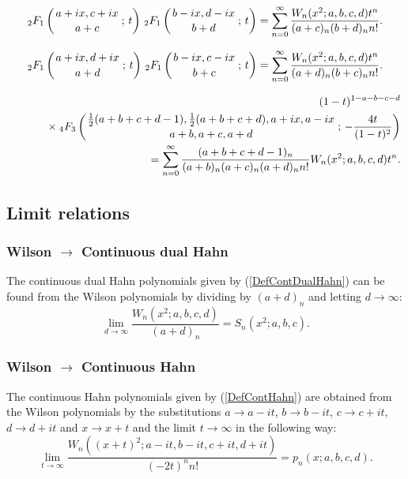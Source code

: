 \documentclass[envcountchap,graybox]{svmono}
\newcounter{rom}
\newcommand{\hyp}[5]{\mbox{}_{#1}{F}_{#2}
\left(\genfrac{}{}{0pt}{}{#3}{#4}\,;\,#5\right)}
\newcommand{\mathindent}{\hspace{7.5mm}}
\begin{document}
\begin{equation}
\label{GenWilson2}
\hyp{2}{1}{a+ix,c+ix}{a+c}{t}\,\hyp{2}{1}{b-ix,d-ix}{b+d}{t}=
\sum_{n=0}^{\infty}\frac{W_n(x^2;a,b,c,d)t^n}{(a+c)_n(b+d)_nn!}.
\end{equation}

\begin{equation}
\label{GenWilson3}
\hyp{2}{1}{a+ix,d+ix}{a+d}{t}\,\hyp{2}{1}{b-ix,c-ix}{b+c}{t}=
\sum_{n=0}^{\infty}\frac{W_n(x^2;a,b,c,d)t^n}{(a+d)_n(b+c)_nn!}.
\end{equation}

\begin{eqnarray}
\label{GenWilson4}
& &(1-t)^{1-a-b-c-d}\nonumber\\
& &{}\mathindent\times\hyp{4}{3}{\frac{1}{2}(a+b+c+d-1),\frac{1}{2}(a+b+c+d),a+ix,a-ix}
{a+b,a+c,a+d}{-\frac{4t}{(1-t)^2}}\nonumber\\
& &{}=\sum_{n=0}^{\infty}\frac{(a+b+c+d-1)_n}{(a+b)_n(a+c)_n(a+d)_nn!}W_n(x^2;a,b,c,d)t^n.
\end{eqnarray}

\subsection*{Limit relations}

\subsubsection*{Wilson $\rightarrow$ Continuous dual Hahn}
The continuous dual Hahn polynomials given by (\ref{DefContDualHahn}) can be found from the
Wilson polynomials by dividing by $(a+d)_n$ and letting $d\rightarrow\infty$:
\begin{equation}
\lim_{d\rightarrow\infty}\frac{W_n(x^2;a,b,c,d)}{(a+d)_n}=S_n(x^2;a,b,c).
\end{equation}

\subsubsection*{Wilson $\rightarrow$ Continuous Hahn}
The continuous Hahn polynomials given by (\ref{DefContHahn}) are obtained from the Wilson
polynomials by the substitutions $a\rightarrow a-it$, $b\rightarrow b-it$, $c\rightarrow c+it$,
$d\rightarrow d+it$ and $x\rightarrow x+t$ and the limit $t\rightarrow\infty$ in the following
way:
\begin{equation}
\lim_{t\rightarrow\infty}
\frac{W_n((x+t)^2;a-it,b-it,c+it,d+it)}{(-2t)^nn!}=p_n(x;a,b,c,d).
\end{equation}
\end{document}
